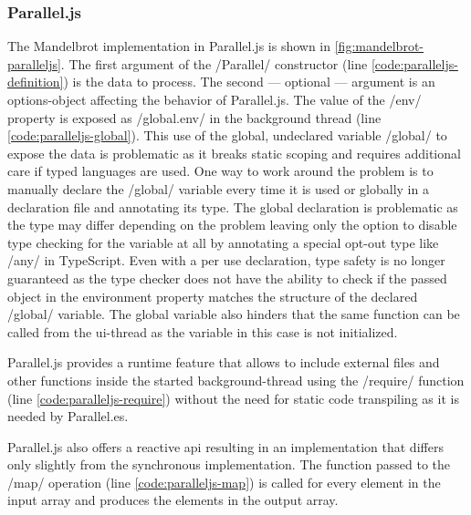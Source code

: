 \subsubsection{Parallel.js}
The Mandelbrot implementation in Parallel.js is shown in \cref{fig:mandelbrot-paralleljs}. The first argument of the \javascriptinline/Parallel/ constructor (line \ref{code:paralleljs-definition}) is the data to process. The second --- optional ---  argument is an options-object affecting the behavior of Parallel.js. The value of the \javascriptinline/env/ property is exposed as \javascriptinline/global.env/ in the background thread (line \ref{code:paralleljs-global}). This use of the global, undeclared variable \javascriptinline/global/ to expose the data is problematic as it breaks static scoping and requires additional care if typed languages are used. One way to work around the problem is to manually declare the \javascriptinline/global/ variable every time it is used or globally in a declaration file and annotating its type. The global declaration is problematic as the type may differ depending on the problem leaving only the option to disable type checking for the variable at all by annotating a special opt-out type like \javascriptinline/any/ in TypeScript. Even with a per use declaration, type safety is no longer guaranteed as the type checker does not have the ability to check if the passed object in the environment property matches the structure of the declared \javascriptinline/global/ variable. The global variable also hinders that the same function can be called from the ui-thread as the variable in this case is not initialized. 

Parallel.js provides a runtime feature that allows to include external files and other functions inside the started background-thread using the \javascriptinline/require/ function (line \ref{code:paralleljs-require}) without the need for static code transpiling as it is needed by Parallel.es. 

Parallel.js also offers a reactive api resulting in an implementation that differs only slightly from the synchronous implementation. The function passed to the \javascriptinline/map/ operation (line \ref{code:paralleljs-map}) is called for every element in the input array and produces the elements in the output array.

